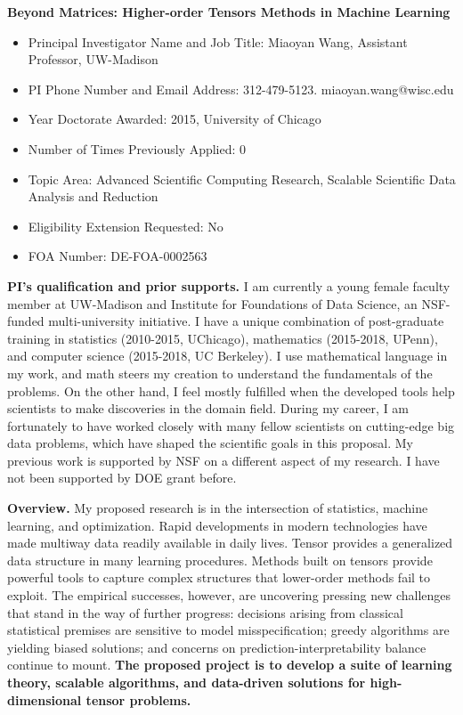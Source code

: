 \documentclass[11pt]{article}
\theoremstyle{plain}
\theoremstyle{definition}
\begin{document}
\begin{center}
\vspace{.2cm}
{\bf \large Beyond Matrices: Higher-order Tensors Methods in Machine Learning}\\
\end{center}
\vspace{.2cm}
\begin{itemize}[wide,noitemsep,topsep=0pt]
\item Principal Investigator Name and Job Title: Miaoyan Wang, Assistant Professor, UW-Madison
\item PI Phone Number and Email Address: 312-479-5123. miaoyan.wang@wisc.edu
\item Year Doctorate Awarded: 2015, University of Chicago
\item Number of Times Previously Applied: 0
\item Topic Area: Advanced Scientific Computing Research, Scalable Scientific Data Analysis and Reduction
\item Eligibility Extension Requested: No
\item FOA Number: DE-FOA-0002563
\end{itemize}


{\bf PI's qualification and prior supports.} I am currently a young female faculty member at UW-Madison and Institute for Foundations of Data Science, an NSF-funded multi-university initiative. I have a unique combination of post-graduate training in statistics (2010-2015, UChicago), mathematics (2015-2018, UPenn), and computer science (2015-2018, UC Berkeley). I use mathematical language in my work, and math steers my creation to understand the fundamentals of the problems. On the other hand, I feel mostly fulfilled when the developed tools help scientists to make discoveries in the domain field. During my career, I am fortunately to have worked closely with many fellow scientists on cutting-edge big data problems, which have shaped the scientific goals in this proposal. My previous work is supported by NSF on a different aspect of my research. I have not been supported by DOE grant before. 

{\bf Overview.} My proposed research is in the intersection of statistics, machine learning, and optimization. Rapid developments in modern technologies have made multiway data readily available in daily lives. Tensor provides a generalized data structure in many learning procedures. Methods built on tensors provide powerful tools to capture complex structures that lower-order methods fail to exploit. The empirical successes, however, are uncovering pressing new challenges that stand in the way of further progress: decisions arising from classical statistical premises are sensitive to model misspecification; greedy algorithms are yielding biased solutions; and concerns on prediction-interpretability balance continue to mount. {\bf The proposed project is to develop a suite of learning theory, scalable algorithms, and data-driven solutions for high-dimensional tensor problems.}
\end{document}
